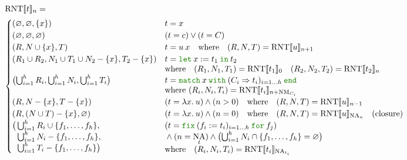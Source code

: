 \documentclass[a4paper,fleqn]{article}
\newcommand{\kwlet}{\mbox{\color{mygreen}\ttfamily let}}
\newcommand{\kwin}{\mbox{\color{mygreen}\ttfamily in}}
\newcommand{\kwmatch}{\mbox{\color{mygreen}\ttfamily match}}
\newcommand{\kwwith}{\mbox{\color{mygreen}\ttfamily with}}
\newcommand{\kwend}{\mbox{\color{mygreen}\ttfamily end}}
\newcommand{\kwfix}{\mbox{\color{mygreen}\ttfamily fix}}
\newcommand{\kwfor}{\mbox{\color{mygreen}\ttfamily for}}
\newcommand{\lam}[2]{\lambda #1.\:#2}
\newcommand{\letin}[3]{\kwlet\:#1:=#2\:\kwin\:#3}
\newcommand{\match}[4]{\kwmatch\:#1\:\kwwith\:(#2 \Rightarrow #3)_{#4}\:\kwend}
\newcommand{\fix}[4]{\kwfix\:(#1 := #2)_{#3}\:\kwfor\:#4}
\DeclareMathOperator{\NA}{NA}
\DeclareMathOperator{\NM}{NM}
\newcommand{\BRA}[1]{\llbracket #1 \rrbracket}
\DeclareMathOperator{\RNTop}{RNT}
\newcommand{\RNT}[2]{\RNTop\BRA{#1}_{#2}}
\begin{document}
\begin{align*}
  &\RNT{t}{n} = \\
  &\begin{cases}
    (\varnothing, \varnothing, \{x\})             & t = x \\
    (\varnothing, \varnothing, \varnothing)         & (t = c) \vee (t = C) \\
    (R, N \cup \{x\}, T)         & t = u\:x \quad \text{where}\quad (R,N,T) = \RNT{u}{n+1} \\
    (R_1 \cup R_2, N_1 \cup T_1 \cup N_2 - \{x\}, T_2 - \{x\})        &
      \begin{aligned}[t]
        & t = \letin{x}{t_1}{t_2} \\
        & \text{where}\quad (R_1,N_1,T_1) = \RNT{t_1}{0} \quad (R_2,N_2,T_2) = \RNT{t_2}{n}
      \end{aligned} \\
    \bigl(\bigcup_{i=1}^h R_i, \bigcup_{i=1}^h N_i, \bigcup_{i=1}^h T_i \bigr)         &
      \begin{aligned}[t]
        & t = \match{x}{C_i}{t_i}{i=1\ldots h} \\
        & \text{where}~(R_i, N_i, T_i) = \RNT{t_i}{n+\NM_{C_i}}
      \end{aligned} \\
    (R, N-\{x\}, T - \{x\})                                           & (t = \lam{x}{u}) \wedge (n > 0) \quad \text{where}\quad  (R, N, T) = \RNT{u}{n-1} \\
    (R, (N \cup T) - \{x\}, \varnothing)                             & (t = \lam{x}{u}) \wedge (n = 0) \quad \text{where}\quad  (R, N, T) = \RNT{u}{\NA_u} \quad \text{(closure)} \\
    \begin{aligned}[t]
      \bigl( & \textstyle\bigcup_{i=1}^h R_i \cup \{f_1,\dotsc, f_h\}, \\
             & \textstyle\bigcup_{i=1}^h N_i - \{f_1,\dotsc, f_h\}, \\
             & \textstyle\bigcup_{i=1}^h T_i - \{f_1,\dotsc, f_h\} \bigr)
    \end{aligned} &
      \begin{aligned}[t]
        & (t = \fix{f_i}{t_i}{i=1\ldots h}{f_j}) \\
        & {} \wedge (n = \NA_t) \wedge \bigl(\textstyle\bigcup_{i=1}^h N_i \cap \{f_1,\dotsc, f_h\} = \varnothing\bigr) \\
        & \text{where}\quad (R_i, N_i, T_i) = \RNT{t_i}{\NA_{t_i}}
      \end{aligned} \\

\end{cases}
\end{align*}
\end{document}
